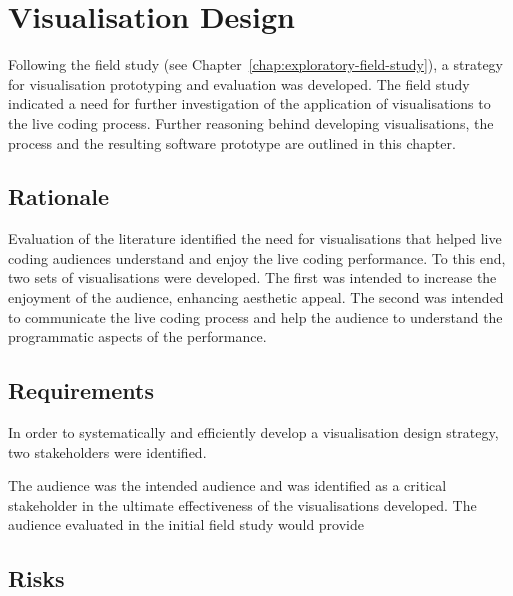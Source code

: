 
\chapter{Visualisation Design}
\label{chap:visualisation-design}

Following the field study (see Chapter~\ref{chap:exploratory-field-study}), a strategy for visualisation prototyping and evaluation was developed. The field study indicated a need for further investigation of the application of visualisations to the live coding process. Further reasoning behind developing visualisations, the process and the resulting software prototype are outlined in this chapter.


\section{Rationale}

Evaluation of the literature identified the need for visualisations that helped live coding audiences understand and enjoy the live coding performance. To this end, two sets of visualisations were developed. The first was intended to increase the enjoyment of the audience, enhancing aesthetic appeal. The second was intended to communicate the live coding process and help the audience to understand the programmatic aspects of the performance.

\section{Requirements}

In order to systematically and efficiently develop a visualisation design strategy, two stakeholders were identified.

The audience was the intended audience and was identified as a critical stakeholder in the ultimate effectiveness of the visualisations developed. The audience evaluated in the initial field study would provide 


% 


\section{Risks}


